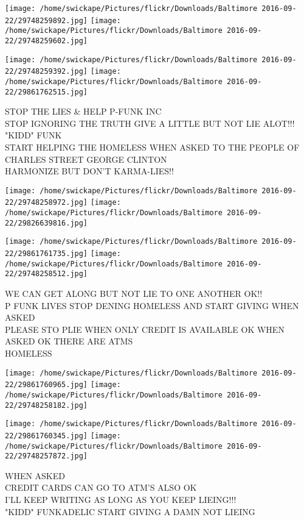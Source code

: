 \documentclass[10pt,letterpaper]{article}
\begin{document}
\texttt{[image: /home/swickape/Pictures/flickr/Downloads/Baltimore 2016-09-22/29748259892.jpg]}
\texttt{[image: /home/swickape/Pictures/flickr/Downloads/Baltimore 2016-09-22/29748259602.jpg]}

\texttt{[image: /home/swickape/Pictures/flickr/Downloads/Baltimore 2016-09-22/29748259392.jpg]}
\texttt{[image: /home/swickape/Pictures/flickr/Downloads/Baltimore 2016-09-22/29861762515.jpg]}

STOP THE LIES \& HELP P{-}FUNK INC\\
STOP IGNORING THE TRUTH GIVE A LITTLE BUT NOT LIE ALOT!!! "KIDD" FUNK\\
START HELPING THE HOMELESS WHEN ASKED TO THE PEOPLE OF CHARLES STREET GEORGE CLINTON\\
HARMONIZE BUT DON'T KARMA{-}LIES!!\\
\pagebreak

\texttt{[image: /home/swickape/Pictures/flickr/Downloads/Baltimore 2016-09-22/29748258972.jpg]}
\texttt{[image: /home/swickape/Pictures/flickr/Downloads/Baltimore 2016-09-22/29826639816.jpg]}

\texttt{[image: /home/swickape/Pictures/flickr/Downloads/Baltimore 2016-09-22/29861761735.jpg]}
\texttt{[image: /home/swickape/Pictures/flickr/Downloads/Baltimore 2016-09-22/29748258512.jpg]}

WE CAN GET ALONG BUT NOT LIE TO ONE ANOTHER OK!!\\
P FUNK LIVES STOP DENING HOMELESS AND START GIVING WHEN ASKED\\
PLEASE STO PLIE WHEN ONLY CREDIT IS AVAILABLE OK WHEN ASKED OK THERE ARE ATMS\\
HOMELESS\\
\pagebreak

\texttt{[image: /home/swickape/Pictures/flickr/Downloads/Baltimore 2016-09-22/29861760965.jpg]}
\texttt{[image: /home/swickape/Pictures/flickr/Downloads/Baltimore 2016-09-22/29748258182.jpg]}

\texttt{[image: /home/swickape/Pictures/flickr/Downloads/Baltimore 2016-09-22/29861760345.jpg]}
\texttt{[image: /home/swickape/Pictures/flickr/Downloads/Baltimore 2016-09-22/29748257872.jpg]}

WHEN ASKED\\
CREDIT CARDS CAN GO TO ATM'S ALSO OK\\
I'LL KEEP WRITING AS LONG AS YOU KEEP LIEING!!!\\
"KIDD" FUNKADELIC START GIVING A DAMN NOT LIEING\\
\pagebreak
\end{document}
